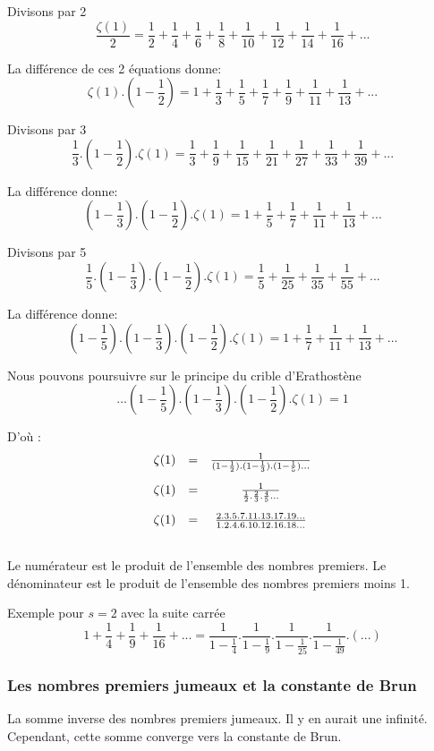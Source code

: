 \documentclass[11pt]{book}
\begin{document}
Divisons par 2
\[ \frac{\zeta(1)}{2} = \frac{1}{2}+\frac{1}{4}+\frac{1}{6}+\frac{1}{8}+\frac{1}{10}+\frac{1}{12} + \frac{1}{14}+ \frac{1}{16}+... \]
 
La différence de ces 2 équations donne:
\[ \zeta(1).(1-\frac{1}{2}) = 1 + \frac{1}{3}+\frac{1}{5}+\frac{1}{7}+\frac{1}{9}+\frac{1}{11}+\frac{1}{13}+ ... \]

Divisons par 3
\[ \frac{1}{3}.(1-\frac{1}{2}).\zeta(1) = \frac{1}{3} + \frac{1}{9}+\frac{1}{15}+\frac{1}{21}+\frac{1}{27}+ \frac{1}{33}+ \frac{1}{39}+... \]

La différence donne:
\[ (1-\frac{1}{3}).(1-\frac{1}{2}).\zeta(1) = 1 + \frac{1}{5} + \frac{1}{7}+\frac{1}{11}+\frac{1}{13}+ ... \]

Divisons par 5
\[ \frac{1}{5}.(1-\frac{1}{3}).(1-\frac{1}{2}).\zeta(1) =    \frac{1}{5} + \frac{1}{25}+\frac{1}{35}+\frac{1}{55}+ ... \]

La différence donne:
\[(1-\frac{1}{5}).(1-\frac{1}{3}).(1-\frac{1}{2}).\zeta(1) = 1 + \frac{1}{7}+\frac{1}{11}+\frac{1}{13}+... \]

Nous pouvons poursuivre sur le principe du crible d'Erathostène
\[ \ldots(1-\frac{1}{5}).(1-\frac{1}{3}).(1-\frac{1}{2}).\zeta(1) = 1 \]

D'où :
$$
\begin{array}{ccc}
\zeta(1) &=& \frac{1}{(1-\frac{1}{2}).(1-\frac{1}{3}).(1-\frac{1}{5})\ldots} \\[\bigskipamount]
\zeta(1) &=& \frac{1}{\frac{1}{2}.\frac{2}{3}.\frac{4}{5}\ldots} 		\\[\bigskipamount]
\zeta(1) &=&  \frac{2.3.5.7.11.13.17.19...}{1.2.4.6.10.12.16.18...} \\[\bigskipamount]
\end{array}
$$

Le numérateur est le produit de l'ensemble des nombres premiers.
Le dénominateur est le produit de l'ensemble des nombres premiers moins 1.


Exemple pour $s=2$ avec la suite carrée
\[ 1+ \frac{1}{4} + \frac{1}{9} + \frac{1}{16} + ...  =  \frac{1}{1-\frac{1}{4}} .\frac{1}{1-\frac{1}{9}}.\frac{1}{1-\frac{1}{25}}.\frac{1}{1-\frac{1}{49}}. (...) \]



\subsubsection{Les nombres premiers jumeaux et la constante de Brun}
La somme inverse des nombres premiers jumeaux. Il y en aurait une infinité. Cependant, cette somme
 converge vers la constante de Brun.
\end{document}
